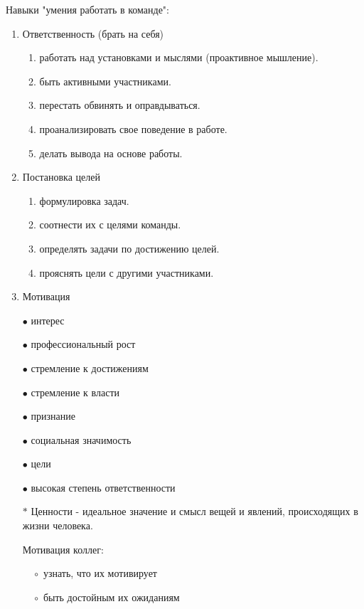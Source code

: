 \documentclass[12pt,a4paper]{report}
\begin{document}
\bigskip
Навыки "умения работать в команде":
\begin{enumerate}
	\item Ответственность (брать на себя)
	\begin{enumerate}
		\item работать над установками и мыслями (проактивное мышление).
		\item быть активными участниками.
		\item перестать обвинять и оправдываться.
		\item проанализировать свое поведение в работе.
		\item делать вывода на основе работы.
	\end{enumerate}
	\item Постановка целей
	\begin{enumerate}
		\item формулировка задач.
		\item соотнести их с целями команды.
		\item определять задачи по достижению целей.
		\item прояснять цели с другими участниками.
	\end{enumerate}
	\item Мотивация
	
	\medskip
	\begin{minipage}{0.4\textwidth}
		$\bullet$ интерес
		
		$\bullet$ профессиональный рост
		
		$\bullet$ стремление к достижениям
		
		$\bullet$ стремление к власти
	\end{minipage}
	\hfill
	\begin{minipage}{0.4\textwidth}
		$\bullet$ признание
		
		$\bullet$ социальная значимость
		
		$\bullet$ цели
		
		$\bullet$ высокая степень ответственности
	\end{minipage}

\medskip
$\ast$ Ценности - идеальное значение и смысл вещей и явлений, происходящих в жизни человека.

\medskip
Мотивация коллег:

	$\hspace{1em}\circ$ узнать, что их мотивирует
	
	$\hspace{1em}\circ$ быть достойным их ожиданиям
	

\end{enumerate}
\end{document}
